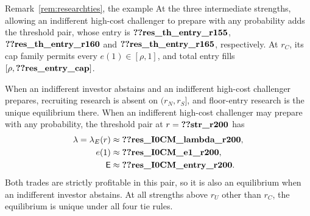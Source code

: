 \begin{named}{Remark~\ref{rem:researchties}, the example}
At the three intermediate strengths, allowing an indifferent high-cost challenger to prepare with any probability
adds the threshold pair, whose entry is \(\reg{res_th_entry_r155}\), \(\reg{res_th_entry_r160}\) and
\(\reg{res_th_entry_r165}\), respectively. At \(r_C\), its cap family permits every \(e(1)\in[\rho,1]\), and
total entry fills \([\rho,\reg{res_entry_cap}]\).

When an indifferent investor abstains and an indifferent high-cost challenger prepares, recruiting research is
absent on \((r_N,r_S]\), and floor-entry research is the unique equilibrium there. When an indifferent high-cost
challenger may prepare with any probability, the threshold pair at \(r=\reg{str_r200}\) has
\[
 \begin{aligned}\lambda=\lambda_E(r)&\approx\reg{res_I0CM_lambda_r200},\\
 e(1)&\approx\reg{res_I0CM_e1_r200},\\
 \Ent&\approx\reg{res_I0CM_entry_r200}.\end{aligned}
\]
Both trades are strictly profitable in this pair, so it is also an equilibrium when an indifferent investor
abstains. At all strengths above \(r_U\) other than \(r_C\), the equilibrium is unique under all four tie rules.
\end{named}

